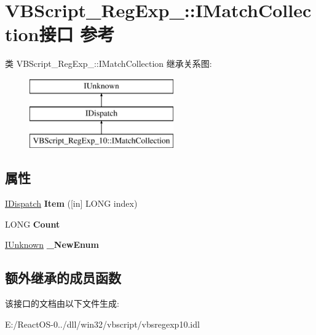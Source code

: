 \hypertarget{interface_v_b_script___reg_exp__10_1_1_i_match_collection}{}\section{V\+B\+Script\+\_\+\+Reg\+Exp\+\_\+:\+:I\+Match\+Collection接口 参考}
\label{interface_v_b_script___reg_exp__10_1_1_i_match_collection}
类 V\+B\+Script\+\_\+\+Reg\+Exp\+\_\+:\+:I\+Match\+Collection 继承关系图\+:\begin{figure}[H]
\begin{center}
\leavevmode
\includegraphics[height=3.000000cm]{interface_v_b_script___reg_exp__10_1_1_i_match_collection}
\end{center}
\end{figure}
\subsection*{属性}
\begin{DoxyCompactItemize}
\item 
\mbox{\label{interface_v_b_script___reg_exp__10_1_1_i_match_collection_ae48406327f5a17567095dc2ea52d0f29}} 
\hyperlink{interface_i_dispatch}{I\+Dispatch} {\bfseries Item} (\mbox{[}in\mbox{]} L\+O\+NG index)
\item 
\mbox{\label{interface_v_b_script___reg_exp__10_1_1_i_match_collection_a084b4492908a22909c144678939cd8df}} 
L\+O\+NG {\bfseries Count}
\item 
\mbox{\label{interface_v_b_script___reg_exp__10_1_1_i_match_collection_a96e2501207298aeb6981c68472ff3a1f}} 
\hyperlink{interface_i_unknown}{I\+Unknown} {\bfseries \+\_\+\+New\+Enum}
\end{DoxyCompactItemize}
\subsection*{额外继承的成员函数}


该接口的文档由以下文件生成\+:\begin{DoxyCompactItemize}
\item 
E\+:/\+React\+O\+S-\/0../dll/win32/vbscript/vbsregexp10.\+idl\end{DoxyCompactItemize}
